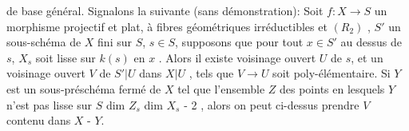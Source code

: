 
de base général. Signalons la suivante (sans démonstration): Soit $f:X\to S$
un morphisme projectif et plat,  à fibres géométriques
 irréductibles et $(R_2)$ , $S'$ un sous-schéma de $X$ fini sur $S$,
$s\in S$, supposons que pour tout $x\in S'$ au dessus de $s$, $X_s$ soit lisse sur
$k(s)$ en $x$ . Alors il existe  voisinage ouvert $U$ de $s$, et un voisinage
ouvert $V$ de $S'|U$ dans $X|U$ , tels que $V\longrightarrow U$ soit poly-élémentaire.
Si $Y$ est un sous-préschéma fermé de $X$ tel que l'ensemble $Z$ des points
en lesquels $Y$ n'est pas lisse sur $S$   
dim $Z_s$ \hand{$\leq$} dim $X_s$ - 2 , alors on peut ci-dessus prendre $V$ contenu dans
$X$ - $Y$.


